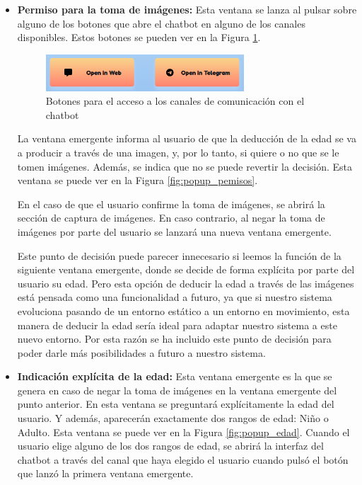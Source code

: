 \begin{itemize}
\item \textbf{Permiso para la toma de imágenes:} Esta ventana se lanza al pulsar sobre alguno de los botones que abre el chatbot en alguno de los canales disponibles. Estos botones se pueden ver en la Figura \ref{fig:botones_canales}.

\begin{figure}[h]
\centering
\includegraphics[width=0.7\textwidth]{imagenes/07_Implementacion/botones_canales.png}
\caption{Botones para el acceso a los canales de comunicación con el chatbot}
\label{fig:botones_canales}
\end{figure}

La ventana emergente informa al usuario de que la deducción de la edad se va a producir a través de una imagen, y, por lo tanto, si quiere o no que se le tomen imágenes. Además, se indica que no se puede revertir la decisión. Esta ventana se puede ver en la Figura \ref{fig:popup_pemisos}.

En el caso de que el usuario confirme la toma de imágenes, se abrirá la sección de captura de imágenes. En caso contrario, al negar la toma de imágenes por parte del usuario se lanzará una nueva ventana emergente.

Este punto de decisión puede parecer innecesario si leemos la función de la siguiente ventana emergente, donde se decide de forma explícita por parte del usuario su edad. Pero esta opción de deducir la edad a través de las imágenes está pensada como una funcionalidad a futuro, ya que si nuestro sistema evoluciona pasando de un entorno estático a un entorno en movimiento, esta manera de deducir la edad sería ideal para adaptar nuestro sistema a este nuevo entorno. Por esta razón se ha incluido este punto de decisión para poder darle más posibilidades a futuro a nuestro sistema.

\item \textbf{Indicación explícita de la edad:} Esta ventana emergente es la que se genera en caso de negar la toma de imágenes en la ventana emergente del punto anterior. En esta ventana se preguntará explícitamente la edad del usuario. Y además, aparecerán exactamente dos rangos de edad: Niño o Adulto. Esta ventana se puede ver en la Figura \ref{fig:popup_edad}. Cuando el usuario elige alguno de los dos rangos de edad, se abrirá la interfaz del chatbot a través del canal que haya elegido el usuario cuando pulsó el botón que lanzó la primera ventana emergente.


\end{itemize}
